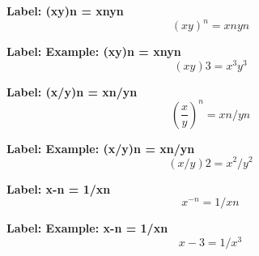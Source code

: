 \textbf{Label: (xy)n = xnyn}
\[(xy)^{n} = xnyn\]

\textbf{Label: Example: (xy)n = xnyn}
\[(xy)3 = x^{3}y^{3}\]

\textbf{Label: (x/y)n = xn/yn}
\[(\frac{x}{y})^{n} = xn/yn\]

\textbf{Label: Example: (x/y)n = xn/yn}
\[(x/y)2 = x^{2} / y^{2}\]

\textbf{Label: x-n = 1/xn}
\[x^{-n} = 1/xn\]

\textbf{Label: Example: x-n = 1/xn}
\[x-3 = 1/x^{3}\]

